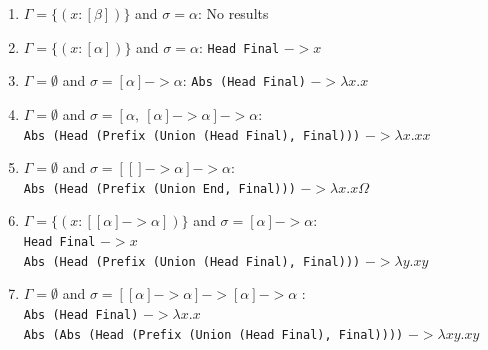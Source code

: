 \documentclass{beamer}
\begin{document}
    \begin{frame}
   
   \begin{enumerate}
       \item $\Gamma = \{(x:[\beta])\}$ and $\sigma = \alpha$: No results
       \item $\Gamma = \{(x:[\alpha])\}$ and $\sigma = \alpha$:
           \qquad\texttt{Head Final} $->x$ 
    \pause
       \item $\Gamma = \emptyset$ and $\sigma = [\alpha] -> \alpha$:
           \qquad \texttt{Abs (Head Final)} $->\lambda x.x$ 
       \pause
              \item $\Gamma = \emptyset$ and $\sigma = [\alpha,\ [\alpha] -> \alpha] -> \alpha$: \\
                   \texttt{Abs (Head (Prefix (Union (Head Final), Final)))}  $->\lambda x.xx$
        \pause
       \item $\Gamma = \emptyset$ and $\sigma = [[] -> \alpha] -> \alpha$:\\
           \qquad \texttt{Abs (Head (Prefix (Union End, Final)))}  $->\lambda x.x\Omega$
       
       \pause
       
       
       \item $\Gamma = \{(x:[[\alpha] -> \alpha])\}$ and $\sigma = [\alpha] -> \alpha$: \\
           \qquad \texttt{Head Final} $->x$\\
            \texttt{Abs (Head (Prefix (Union (Head Final), Final)))} $->\lambda y.xy$
       \pause
           
       \item $\Gamma = \emptyset$ and $\sigma = [[\alpha] -> \alpha] -> [\alpha] -> \alpha$ : \\
           \qquad \texttt{Abs (Head Final)} $->\lambda x.x$\\
           \qquad \texttt{Abs (Abs (Head (Prefix (Union (Head Final), Final))))} $->\lambda xy.xy$    
   \end{enumerate}
    \end{frame}
    
\end{document}
